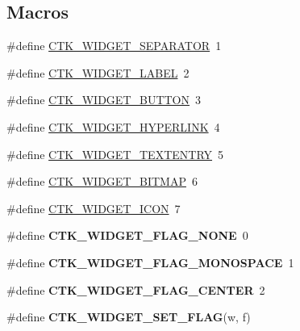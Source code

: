 \subsection*{Macros}
\begin{DoxyCompactItemize}
\item 
\#define \hyperlink{group__ctkdraw_ga0d2cd2b8d5b238bdeedb7a8cf5c0e58a}{C\+T\+K\+\_\+\+W\+I\+D\+G\+E\+T\+\_\+\+S\+E\+P\+A\+R\+A\+T\+O\+R}~1
\item 
\#define \hyperlink{group__ctkdraw_ga1fb739218fa5f53c992a3bcf2c7e0c57}{C\+T\+K\+\_\+\+W\+I\+D\+G\+E\+T\+\_\+\+L\+A\+B\+E\+L}~2
\item 
\#define \hyperlink{group__ctkdraw_gae8adf9839c98a840b0b9b7c070422440}{C\+T\+K\+\_\+\+W\+I\+D\+G\+E\+T\+\_\+\+B\+U\+T\+T\+O\+N}~3
\item 
\#define \hyperlink{group__ctkdraw_gad35ef85bb5562d70cee05f97968dadbc}{C\+T\+K\+\_\+\+W\+I\+D\+G\+E\+T\+\_\+\+H\+Y\+P\+E\+R\+L\+I\+N\+K}~4
\item 
\#define \hyperlink{group__ctkdraw_ga4f9b2f0c9b72be56a1aa1abab7867c2c}{C\+T\+K\+\_\+\+W\+I\+D\+G\+E\+T\+\_\+\+T\+E\+X\+T\+E\+N\+T\+R\+Y}~5
\item 
\#define \hyperlink{group__ctkdraw_ga9e586304672935cb02e405d7efecfb5b}{C\+T\+K\+\_\+\+W\+I\+D\+G\+E\+T\+\_\+\+B\+I\+T\+M\+A\+P}~6
\item 
\#define \hyperlink{group__ctkdraw_ga392197354637697c585c8f6f618e5507}{C\+T\+K\+\_\+\+W\+I\+D\+G\+E\+T\+\_\+\+I\+C\+O\+N}~7
\item 
\hypertarget{group__ctkdraw_ga94db6c762d672de691ce58fc2c08363e}{}\#define {\bfseries C\+T\+K\+\_\+\+W\+I\+D\+G\+E\+T\+\_\+\+F\+L\+A\+G\+\_\+\+N\+O\+N\+E}~0\label{group__ctkdraw_ga94db6c762d672de691ce58fc2c08363e}

\item 
\hypertarget{group__ctkdraw_gaee0da4f98d38aff2b2bd49fec5051f20}{}\#define {\bfseries C\+T\+K\+\_\+\+W\+I\+D\+G\+E\+T\+\_\+\+F\+L\+A\+G\+\_\+\+M\+O\+N\+O\+S\+P\+A\+C\+E}~1\label{group__ctkdraw_gaee0da4f98d38aff2b2bd49fec5051f20}

\item 
\hypertarget{group__ctkdraw_gaa9cdfa7ba5034052cbd9a154b2d370b5}{}\#define {\bfseries C\+T\+K\+\_\+\+W\+I\+D\+G\+E\+T\+\_\+\+F\+L\+A\+G\+\_\+\+C\+E\+N\+T\+E\+R}~2\label{group__ctkdraw_gaa9cdfa7ba5034052cbd9a154b2d370b5}

\item 
\hypertarget{group__ctkdraw_gadc9df0318ab76bd1f3d5031a22246ced}{}\#define {\bfseries C\+T\+K\+\_\+\+W\+I\+D\+G\+E\+T\+\_\+\+S\+E\+T\+\_\+\+F\+L\+A\+G}(w,  f)\label{group__ctkdraw_gadc9df0318ab76bd1f3d5031a22246ced}


\end{DoxyCompactItemize}

